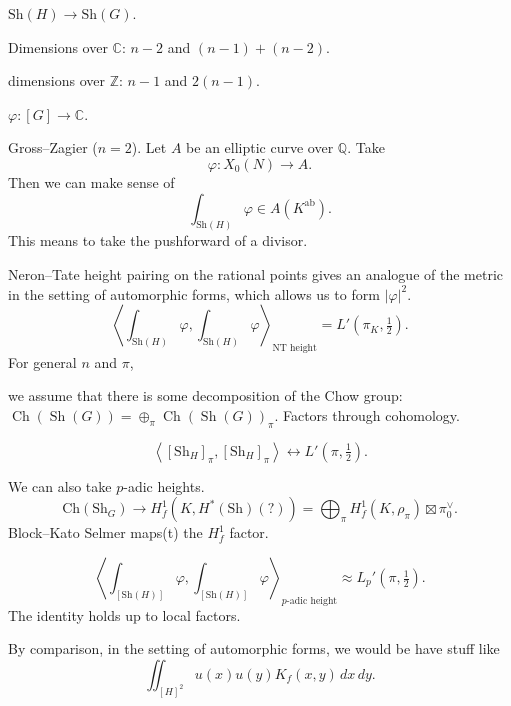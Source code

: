 \documentclass[reqno]{amsart} 
\begin{document}
$\mathrm{Sh}(H) \rightarrow \mathrm{Sh}(G)$.

Dimensions over $\mathbb{C}$: $n - 2$ and $(n - 1) +(n - 2)$.

dimensions over $\mathbb{Z}$: $n - 1$ and $2(n - 1)$.

$\varphi : [G] \rightarrow \mathbb{C}$.

\begin{example}\label{example:cnfg5j3x18}
  Gross--Zagier ($n = 2$).  Let $A$ be an elliptic curve over $\mathbb{Q}$.  Take
  \begin{equation*}
    \varphi : X_0(N) \rightarrow A.
  \end{equation*}
  Then we can make sense of
  \begin{equation*}
    \int_{\mathrm{Sh}(H)} \varphi \in A(K^{\mathrm{ab}}).
  \end{equation*}
  This means to take the pushforward of a divisor.

  Neron--Tate height pairing on the rational points gives an analogue of the metric in the setting of automorphic forms, which allows us to form $\lvert \varphi \rvert^2$.
  \begin{equation*}
    \left\langle
      \int_{\mathrm{Sh}(H)} \varphi,
      \int_{\mathrm{Sh}(H)} \varphi
    \right\rangle_{\mathrm{NT} \text{ height}} = L '(\pi_K, \tfrac{1}{2}).
  \end{equation*}
  For general $n$ and $\pi$,

  we assume that there is some decomposition of the Chow group: $\operatorname{Ch}(\operatorname{Sh}(G)) = \oplus_\pi \operatorname{Ch}(\operatorname{Sh}(G))_\pi$.  Factors through cohomology.
  
  \begin{equation*}
    \left\langle [\mathrm{Sh}_H]_\pi, [\mathrm{Sh}_H]_\pi \right\rangle
    \leftrightarrow
    L '(\pi, \tfrac{1}{2}).
  \end{equation*}

  We can also take $p$-adic heights.
  \begin{equation*}
    \mathrm{Ch}(\mathrm{Sh}_G) \rightarrow  H^1_f(K, H^\ast(\mathrm{Sh})(?))
    = \bigoplus_\pi H_f^1(K, \rho_\pi) \boxtimes \pi_0^\vee.
  \end{equation*}
  Block--Kato Selmer maps(t) the $H^1_f$ factor.

  \begin{theorem}\label{theorem:cnfg5jyfj8}
    \begin{equation*}
      \left\langle \int_{[\mathrm{Sh}(H)]} \varphi, \int_{[\mathrm{Sh}(H)]} \varphi \right\rangle_{\text{$p$-adic height}}
      \approx L_p '(\pi , \tfrac{1}{2}).
    \end{equation*}
    The identity holds up to local factors.
  \end{theorem}

  By comparison, in the setting of automorphic forms, we would be have stuff like
  \begin{equation*}
    \iint_{[H]^2 } u(x) u(y) K_f(x,y) \, d x \, d y.
  \end{equation*}

  
\end{example}
\end{document}
